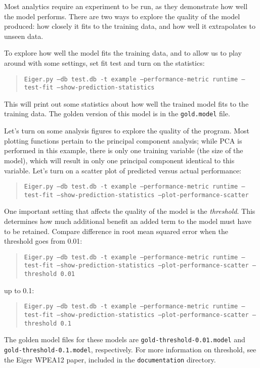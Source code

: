 Most analytics require an experiment to be run, as they demonstrate how well the model performs. There are two ways to explore the quality of the model produced: how closely it fits to the training data, and how well it extrapolates to unseen data.

To explore how well the model fits the training data, and to allow us to play around with some settings, set fit test and turn on the statistics:
	\begin{quote}
	\texttt{Eiger.py --db test.db -t example --performance-metric runtime
                     --test-fit --show-prediction-statistics}
	\end{quote}
This will print out some statistics about how well the trained model fits to the training data. The golden version of this model is in the \texttt{gold.model} file.

Let's turn on some analysis figures to explore the quality of the program. Most plotting functions pertain to the principal component analysis; while PCA is performed in this example, there is only one training variable (the size of the model), which will result in only one principal component identical to this variable. Let's turn on a scatter plot of predicted versus actual performance:
	\begin{quote}
	\texttt{Eiger.py --db test.db -t example --performance-metric runtime
                     --test-fit --show-prediction-statistics
                     --plot-performance-scatter}
	\end{quote}

One important setting that affects the quality of the model is the {\em threshold}. This determines how much additional benefit an added term to the model must have to be retained. Compare difference in root mean squared error when the threshold goes from 0.01:
	\begin{quote}
	\texttt{Eiger.py --db test.db -t example --performance-metric runtime
                     --test-fit --show-prediction-statistics
                     --plot-performance-scatter
                     --threshold 0.01}
	\end{quote}
up to 0.1:
	\begin{quote}
	\texttt{Eiger.py --db test.db -t example --performance-metric runtime
                     --test-fit --show-prediction-statistics
                     --plot-performance-scatter
                     --threshold 0.1}
	\end{quote}
The golden model files for these models are \texttt{gold-threshold-0.01.model} and \texttt{gold-threshold-0.1.model}, respectively. For more information on threshold, see the Eiger WPEA12 paper, included in the \texttt{documentation} directory.

